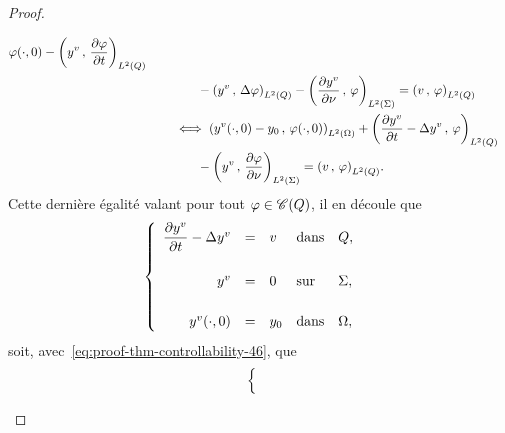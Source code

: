 \begin{proof}
\begin{enumerate}
\begin{equation*}
\begin{split}
{                    }{%
                        \condinitiale{\vphi}
                    } - \scalaireq{%
                        y^{v}
                    }{%
                        \primetemps{\vphi}
                    }\\
                    &\qquad\qquad - \scalaireq{%
                        y^{v}
                    }{%
                        \Delta\vphi{}
                    } - \scalaires{%
                        \deriveenormale{y^{v}}
                    }{%
                        \vphi{}
                    } = \scalaireq{v}{\vphi}\\
                    &\qquad \iff \scalaireohm{%
                        \condinitiale{y^{v}} - y_{0}
                    }{%
                        \condinitiale{\vphi}
                    } + \scalaireq{%
                        \primetemps{y^{v}} - \Delta y^{v}
                    }{%
                        \vphi{}
                    }\\
                    &\qquad\qquad - \scalaires{%
                        y^{v}
                    }{%
                        \deriveenormale{\vphi}
                    } = \scalaireq{v}{\vphi}.
                \end{split}
            \end{equation*}
            Cette dernière égalité valant pour tout $\varphi\in\mathscr{C}(Q)$, il
            en découle que
            \begin{equation*}
                \begin{cases}\displaystyle
                    \begin{array}{rclll}
                        \dfrac{\partial{}y^{v}}{\partial{}t} - \Delta y^{v} & = & v &
                        \text{dans} & Q,\\
                        \\
                        y^{v} & = & 0 & \text{sur} & \Sigma,\\
                        \\
                        {y^{v}}\!\left({\cdot, 0}\right) & = & y_{0} & \text{dans} &
                        \Omega,
                    \end{array}
                \end{cases}
            \end{equation*}
            soit, avec~\eqref{eq:proof-thm-controllability-46}, que
            \begin{equation*}
                \begin{cases}\displaystyle

\end{cases}
\end{equation*}
\end{enumerate}
\end{proof}
